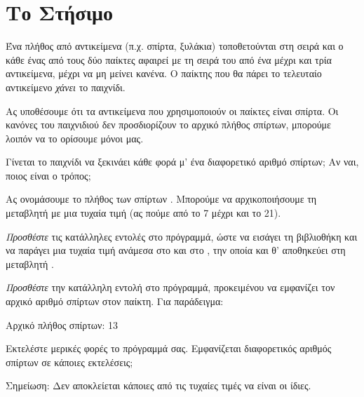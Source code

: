\documentclass[a4paper,11pt,oneside]{book}
\begin{document}
\section{Το Στήσιμο}

Ένα πλήθος από αντικείμενα (π.χ. σπίρτα, ξυλάκια) τοποθετούνται στη σειρά και ο κάθε ένας από τους δύο παίκτες αφαιρεί με τη σειρά του από ένα μέχρι και τρία αντικείμενα, μέχρι να μη μείνει κανένα. Ο παίκτης που θα πάρει το τελευταίο αντικείμενο \emph{χάνει} το παιχνίδι. 

\begin{step}

Ας υποθέσουμε ότι τα αντικείμενα που χρησιμοποιούν οι παίκτες είναι σπίρτα. Οι κανόνες του παιχνιδιού δεν προσδιορίζουν το αρχικό πλήθος σπίρτων, μπορούμε λοιπόν να το ορίσουμε μόνοι μας. 


Γίνεται το παιχνίδι να ξεκινάει κάθε φορά μ' ένα διαφορετικό αριθμό σπίρτων; Αν ναι, ποιος είναι ο τρόπος;

\marginnote[14pt]{\icondiscuss}
\dottedline

\dottedline

Ας ονομάσουμε το πλήθος των σπίρτων . Μπορούμε να αρχικοποιήσουμε τη μεταβλητή  με μια τυχαία τιμή (ας πούμε από το 7 μέχρι και το 21).

\emph{Προσθέστε} τις κατάλληλες εντολές στο πρόγραμμά, ώστε να εισάγει τη βιβλιοθήκη  και να παράγει μια τυχαία τιμή ανάμεσα στο  και στο , την οποία και θ' αποθηκεύει στη μεταβλητή .
\end{step}

\begin{step}
\emph{Προσθέστε} την κατάλληλη εντολή στο πρόγραμμά, προκειμένου να εμφανίζει τον αρχικό αριθμό σπίρτων στον παίκτη. Για παράδειγμα:

\marginnote[14pt]{\iconcomputer}
\begin{pyterm}
Αρχικό πλήθος σπίρτων: 13
\end{pyterm}

Εκτελέστε μερικές φορές το πρόγραμμά σας. Εμφανίζεται διαφορετικός αριθμός σπίρτων σε κάποιες εκτελέσεις; 

\begin{note}
Σημείωση: Δεν αποκλείεται κάποιες από τις τυχαίες τιμές να είναι οι ίδιες.
\end{note}

\marginnote[14pt]{\icondiscuss}
\dottedline
\end{step}
\end{document}
